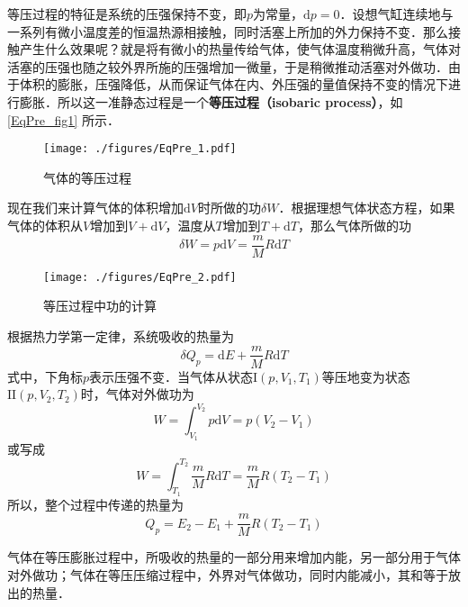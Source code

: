 

等压过程的特征是系统的压强保持不变，即$p $为常量，$\mathrm dp =0$．设想气缸连续地与一系列有微小温度差的恒温热源相接触，同时活塞上所加的外力保持不变．那么接触产生什么效果呢？就是将有微小的热量传给气体，使气体温度稍微升高，气体对活塞的压强也随之较外界所施的压强增加一微量，于是稍微推动活塞对外做功．由于体积的膨胀，压强降低，从而保证气体在内、外压强的量值保持不变的情况下进行膨胀．所以这一准静态过程是一个\textbf{等压过程（isobaric process）}，如\autoref{EqPre_fig1} 所示．
\begin{figure}[ht]
\centering
\texttt{[image: ./figures/EqPre\_1.pdf]}
\caption{气体的等压过程} \label{EqPre_fig1}
\end{figure}
现在我们来计算气体的体积增加$\mathrm d V $时所做的功$\delta W$．根据理想气体状态方程，如果气体的体积从$V $增加到$V+\mathrm dV$，温度从$T $增加到$T+\mathrm dT$，那么气体所做的功
\begin{equation}
\delta W=p \mathrm{d} V=\frac{m}{M} R \mathrm{d} T
\end{equation}
\begin{figure}[ht]
\centering
\texttt{[image: ./figures/EqPre\_2.pdf]}
\caption{等压过程中功的计算} \label{EqPre_fig2}
\end{figure}
根据热力学第一定律，系统吸收的热量为
\begin{equation}
\delta Q_{p}=\mathrm{d} E+\frac{m}{M} R \mathrm{d} T
\end{equation}
式中，下角标$p $表示压强不变．当气体从状态$\mathrm I(p, V_1, T_1)$等压地变为状态$\mathrm{II}(p, V_2,T_2)$时，气体对外做功为
\begin{equation}
W=\int_{V_{1}}^{V_{2}} p \mathrm{d} V=p\left(V_{2}-V_{1}\right)
\end{equation}
或写成
\begin{equation}
W=\int_{T_{1}}^{T_{2}} \frac{m}{M} R \mathrm{d} T=\frac{m}{M} R\left(T_{2}-T_{1}\right)
\end{equation}
所以，整个过程中传递的热量为
\begin{equation}
Q_{p}=E_{2}-E_{1}+\frac{m}{M} R\left(T_{2}-T_{1}\right)
\end{equation}

气体在等压膨胀过程中，所吸收的热量的一部分用来增加内能，另一部分用于气体对外做功；气体在等压压缩过程中，外界对气体做功，同时内能减小，其和等于放出的热量．


